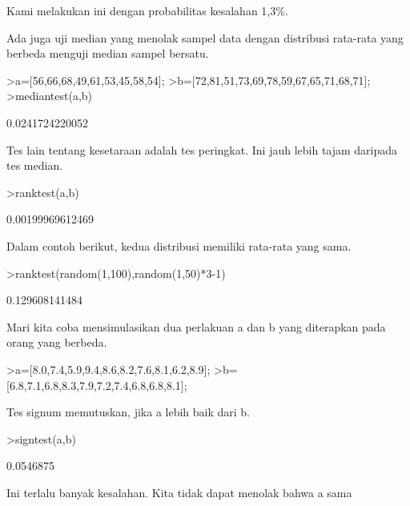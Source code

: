 \documentclass[a4paper,10pt]{article}
\begin{document}
\begin{eulernotebook}
\begin{eulercomment}
\begin{eulercomment}
\begin{eulercomment}
\begin{eulercomment}
\begin{eulercomment}
\begin{eulercomment}
\begin{eulercomment}
\begin{eulercomment}
\begin{eulercomment}
\begin{eulercomment}
\begin{eulercomment}
\begin{eulercomment}
\begin{eulercomment}
\begin{eulercomment}
\begin{eulercomment}
\begin{eulercomment}
\begin{eulercomment}
\begin{eulercomment}
\begin{eulercomment}
Kami melakukan ini dengan probabilitas kesalahan 1,3\%.

Ada juga uji median yang menolak sampel data dengan distribusi
rata-rata yang berbeda menguji median sampel bersatu.
\end{eulercomment}
\begin{eulerprompt}
>a=[56,66,68,49,61,53,45,58,54];
>b=[72,81,51,73,69,78,59,67,65,71,68,71];
>mediantest(a,b)
\end{eulerprompt}
\begin{euleroutput}
  0.0241724220052
\end{euleroutput}
\begin{eulercomment}
Tes lain tentang kesetaraan adalah tes peringkat. Ini jauh lebih tajam
daripada tes median.
\end{eulercomment}
\begin{eulerprompt}
>ranktest(a,b)
\end{eulerprompt}
\begin{euleroutput}
  0.00199969612469
\end{euleroutput}
\begin{eulercomment}
Dalam contoh berikut, kedua distribusi memiliki rata-rata yang sama.
\end{eulercomment}
\begin{eulerprompt}
>ranktest(random(1,100),random(1,50)*3-1)
\end{eulerprompt}
\begin{euleroutput}
  0.129608141484
\end{euleroutput}
\begin{eulercomment}
Mari kita coba mensimulasikan dua perlakuan a dan b yang diterapkan
pada orang yang berbeda.
\end{eulercomment}
\begin{eulerprompt}
>a=[8.0,7.4,5.9,9.4,8.6,8.2,7.6,8.1,6.2,8.9];
>b=[6.8,7.1,6.8,8.3,7.9,7.2,7.4,6.8,6.8,8.1];
\end{eulerprompt}
\begin{eulercomment}
Tes signum memutuskan, jika a lebih baik dari b.
\end{eulercomment}
\begin{eulerprompt}
>signtest(a,b)
\end{eulerprompt}
\begin{euleroutput}
  0.0546875
\end{euleroutput}
\begin{eulercomment}
Ini terlalu banyak kesalahan. Kita tidak dapat menolak bahwa a sama

\end{eulercomment}
\end{eulercomment}
\end{eulercomment}
\end{eulercomment}
\end{eulercomment}
\end{eulercomment}
\end{eulercomment}
\end{eulercomment}
\end{eulercomment}
\end{eulercomment}
\end{eulercomment}
\end{eulercomment}
\end{eulercomment}
\end{eulercomment}
\end{eulercomment}
\end{eulercomment}
\end{eulercomment}
\end{eulercomment}
\end{eulercomment}
\end{eulernotebook}
\end{document}
